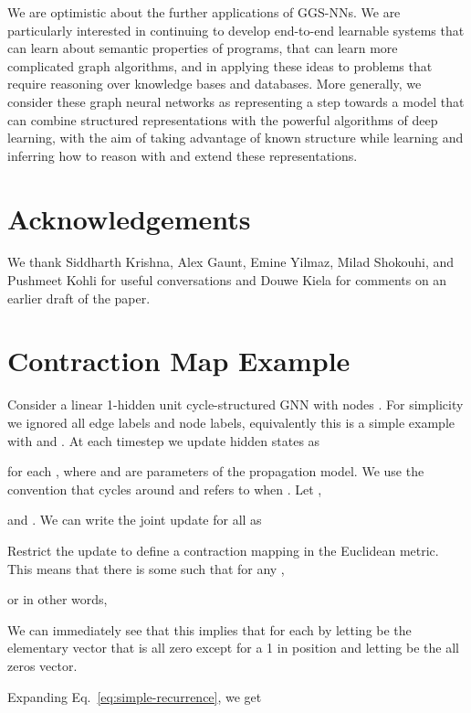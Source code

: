 \documentclass{article} \usepackage{iclr2016_conference,times}
\newcommand{\OurMethodShort}{GGS-NN}
\newcommand{\OurMethodShorts}{\OurMethodShort s}
\begin{document}
We are optimistic about the further applications of \OurMethodShorts.
We are particularly interested in continuing to develop end-to-end learnable
systems that can learn about semantic properties of programs, that can
learn more complicated graph algorithms,  and in
applying these ideas to problems that
require reasoning over knowledge bases and databases.
More generally, we consider these graph neural networks as representing a
step towards a model that can combine structured representations with the
powerful algorithms of deep learning, with the aim of taking advantage of known
structure while learning and inferring how to reason with and extend 
these representations.


\section*{Acknowledgements}
We thank Siddharth Krishna, Alex Gaunt,
Emine Yilmaz, Milad Shokouhi,
and Pushmeet Kohli for useful
conversations and Douwe Kiela for comments on an earlier draft of the
paper.






\newpage
\appendix

\section{Contraction Map Example}
\label{appendix:contraction-example}

Consider a linear 1-hidden unit cycle-structured GNN with  nodes
. For simplicity we ignored all edge labels and node labels,
equivalently this is a simple example with  and
.
At each timestep  we update hidden states 
as

for each , where  and  are parameters of the propagation model.  We use the convention that
 cycles around and refers to 
when .
Let ,

and .
We can write the joint update for all  as

Restrict the update to define a contraction mapping in the
Euclidean metric. This means that there is some  such that for any ,

or in other words,

We can immediately see that this implies that  for
each  by letting  be the elementary vector that is all
zero except for a 1 in position  and letting  be the all zeros vector.

Expanding Eq.~\ref{eq:simple-recurrence}, we get
\end{document}
